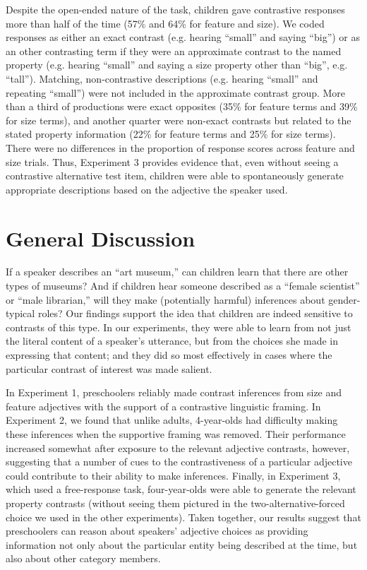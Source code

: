 \documentclass[man]{apa2}
\begin{document}
Despite the open-ended nature of the task, children gave contrastive responses more than half of the time (57\% and 64\% for feature and size).  We coded responses as either an exact contrast (e.g. hearing ``small'' and saying ``big'') or as an other contrasting term if they were an approximate contrast to the named property (e.g. hearing ``small'' and saying a size property other than ``big'', e.g. ``tall''). Matching, non-contrastive descriptions (e.g. hearing ``small'' and repeating ``small'') were not included in the approximate contrast group. More than a third of productions were exact opposites (35\% for feature terms and 39\% for size terms), and another quarter were non-exact contrasts but related to the stated property information (22\% for feature terms and 25\% for size terms). There were no differences in the proportion of response scores across feature and size trials. Thus, Experiment 3 provides evidence that, even without seeing a contrastive alternative test item, children were able to spontaneously generate appropriate descriptions based on the adjective the speaker used.  

\section{General Discussion}

If a speaker describes an ``art museum,'' can children learn that there are other types of museums? And if children hear someone described as a ``female scientist'' or ``male librarian,'' will they make (potentially harmful) inferences about gender-typical roles? Our findings support the idea that children are indeed sensitive to contrasts of this type. In our experiments, they were able to learn from not just the literal content of a speaker's utterance, but from the choices she made in expressing that content; and they did so most effectively in cases where the particular contrast of interest was made salient.

In Experiment 1, preschoolers reliably made contrast inferences from size and feature adjectives with the support of a contrastive linguistic framing.  In Experiment 2, we found that unlike adults, 4-year-olds had difficulty making these inferences when the supportive framing was removed. Their performance increased somewhat after exposure to the relevant adjective contrasts, however, suggesting that a number of cues to the contrastiveness of a particular adjective could contribute to their ability to make inferences. Finally, in Experiment 3, which used a free-response task, four-year-olds were able to generate the relevant property contrasts (without seeing them pictured in the two-alternative-forced choice we used in the other experiments). Taken together, our results suggest that preschoolers can reason about speakers' adjective choices as providing information not only about the particular entity being described at the time, but also about other category members. 
\end{document}
